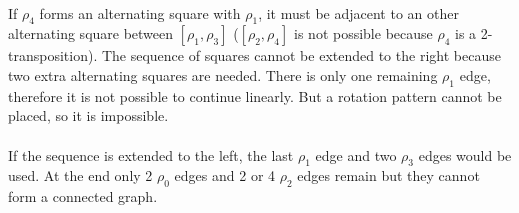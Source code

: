\begin{figure}[H]
  \begin{center}
    \caption{}
  \end{center}
\end{figure}

\paragraph{}
If $\rho_4$ forms an alternating square with $\rho_1$, it must be adjacent to an other alternating square between $[\rho_1, \rho_3]$ ($[\rho_2, \rho_4]$ is not possible because $\rho_4$ is a 2-transposition). The sequence of squares cannot be extended to the right because two extra alternating squares are needed. There is only one remaining $\rho_1$ edge, therefore it is not possible to continue linearly. But a rotation pattern cannot be placed, so it is impossible.

\paragraph{}
If the sequence is extended to the left, the last $\rho_1$ edge and two $\rho_3$ edges would be used. At the end only 2 $\rho_0$ edges and 2 or 4 $\rho_2$ edges remain but they cannot form a connected graph.

